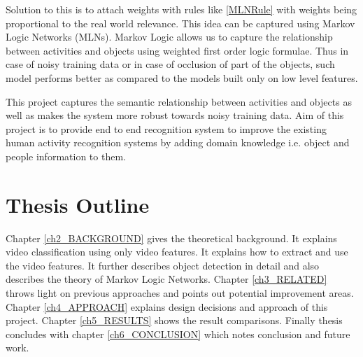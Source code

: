 Solution to this is to attach weights with rules like \eqref{MLNRule} with weights being proportional to the real world relevance.
This idea can be captured using Markov Logic Networks (MLNs). Markov Logic allows us 
to capture the relationship between activities and objects using weighted first order logic formulae.
Thus in case of noisy training data or in case of occlusion of part of the objects,
such model performs better as compared to the models built only on low level features.


This project captures the semantic relationship between activities and objects 
as well as makes the system more robust towards noisy training data.
Aim of this project is to provide end to end recognition system to improve 
the existing human activity recognition systems
by adding domain knowledge i.e. object and people information to them.



 \section{Thesis Outline}
Chapter \ref{ch2_BACKGROUND} gives the theoretical background. It explains video classification using only video features. It explains how to extract and use the video features. 
It further describes object detection in detail and also describes the theory of Markov Logic Networks. 
Chapter \ref{ch3_RELATED} throws light on previous approaches and points out potential improvement areas.
Chapter \ref{ch4_APPROACH} explains design decisions and approach of this project.
Chapter \ref{ch5_RESULTS} shows the result comparisons.
Finally thesis concludes with chapter \ref{ch6_CONCLUSION} which notes conclusion and future work.
